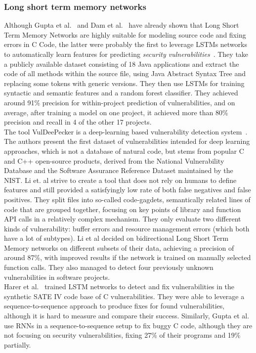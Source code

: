 \documentclass[
a4paper,
pagesize,
pdftex,
12pt,
twoside, %
BCOR=5mm, %
ngerman,
fleqn,
final,
]{scrartcl}
\begin{document}
	\subsubsection{Long short term memory networks}
	Although Gupta et al.~\cite{Gupta.2017b} and Dam et al.~\cite{Dam.2016b} have already shown that Long Short Term Memory Networks are highly suitable for modeling source code and fixing errors in C Code, the latter were probably the first to leverage LSTMs networks to automatically learn features for predicting \textit{security vulnerabilities}~\cite{Dam.2017}. They take a publicly available dataset consisting of 18 Java applications and extract the code of all methods within the source file, using Java Abstract Syntax Tree and replacing some tokens with generic versions. They then use LSTMs for training syntactic and semantic features and a random forest classifier. They achieved around 91\% precision for within-project prediction of vulnerabilities, and on average, after training a model on one project, it achieved more than 80\% precision and recall in 4 of the other 17 projects.\\
	The tool VulDeePecker is a deep-learning based vulnerability detection system~\cite{Li.2018}. The authors present the first dataset of vulnerabilities intended for deep learning approaches, which is not a database of natural code, but stems from popular C and C++ open-source products, derived from the National Vulnerability Database and the Software Assurance Reference Dataset maintained by the NIST. Li et. al strive to create a tool that does not rely on humans to define features and still provided a satisfyingly low rate of both false negatives and false positives. They split files into so-called code-gagdets, semantically related lines of code that are grouped together, focusing on key points of library and function API calls in a relatively complex mechanism. They only evaluate two different kinds of vulnerability: buffer errors and resource management errors (which both have a lot of subtypes). Li et al decided on bidirectional Long Short Term Memory networks on different subsets of their data, achieving a precision of around 87\%, with improved results if the network is trained on manually selected function calls. They also managed to detect four previously unknown vulnerabilities in software projects. \\
	Harer et al.~\cite{Harer.2018} trained LSTM networks to detect and fix vulnerabilities in the synthetic SATE IV code base of C vulnerabilities. They were able to leverage a sequence-to-sequence approach to produce fixes for found vulnerabilities, although it is hard to measure and compare their success. Similarly, Gupta et al.~\cite{Gupta.2017} use RNNs in a sequence-to-sequence setup to fix buggy C code, although they are not focusing on security vulnerabilities, fixing 27\% of their programs and 19\% partially.
	
\end{document}
